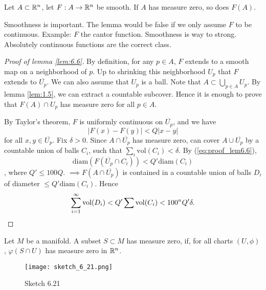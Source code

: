 \begin{lemma}\label{lem:6.6}
    Let \(A\subset\mathbb{R}^n\), let \(F:A\to\mathbb{R}^n\) be smooth. If \(A\) has measure zero, so does \(F(A)\).
\end{lemma}

\begin{remark}
    Smoothness is important. The lemma would be false if we only assume \(F\) to be continuous. Example: 
    \(F\) the cantor function. Smoothness is way to strong. Absolutely continuous functions are the correct class.
\end{remark}

\begin{proof}[Proof of lemma \ref{lem:6.6}]
    By definition, for any \(p\in A\), \(F\) extends to a smooth map on a neighborhood of \(p\). Up 
    to shrinking this neighborhood \(U_p\) that \(F\) extends to \(\overline{U_p}\). We can also assume that 
    \(U_p\) is a ball. Note that \(A\subset \bigcup_{p\in A} U_p\). By lemma \ref{lem:1.5}, we can extract 
    a countable subcover. Hence it is enough to prove that \(F(A)\cap U_p\) has measure zero for 
    all \(p\in A\). 

    By Taylor's theorem, \(F\) is uniformly continuous on \(\overline{U_p}\),
    and we have 
    \begin{equation}\label{eq:proof_lem6.6}
        |F(x)-F(y)|< Q|x-y|  
    \end{equation}
    for all \(x,y\in\overline{U_p}\). Fix \(\delta>0\). Since \(A\cap \overline{U_p}\) has measure zero, 
    can cover \(A\cup \overline{U_p}\) by a countable union of balls \(C_i\), such that  
    \(\sum_{i}\text{vol}(C_i)<\delta.\) By (\ref{eq:proof_lem6.6}), \[\text{diam}(F(\overline{U_p}\cap C_i))<Q'\text{diam}(C_i)\],
    where \(Q'\leq 100Q\). \(\implies F(A\cap \overline{U_p})\) is contained in a countable union of balls \(D_i\)
    of diameter \(\leq Q'\text{diam}(C_i)\). Hence 
    \[\sum_{i=1}^\infty\text{vol}(D_i)<Q'\sum\text{vol}(C_i)<100^n Q'\delta.\qedhere\]

\end{proof}

\begin{definition*}
    Let \(M\) be a manifold. A subset \(S\subset M\) has measure zero, if, for all charts \((U,\phi)\),
    \(\varphi(S\cap U)\) has measure zero in \(\mathbb{R}^n\).
    \begin{figure}[H]\label{fig:6.21}
        \centering
        \texttt{[image: sketch\_6\_21.png]}
        \caption{Sketch 6.21}
    \end{figure}
\end{definition*}

